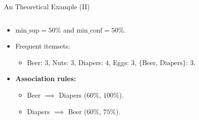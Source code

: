 \begin{frame}{An Theoretical Example (II)}
\begin{columns}
\begin{column}{0.5\textwidth}
\begin{itemize}
\begin{itemize}
					      \item $\text{min\_sup} = 50\%$ and $\text{min\_conf} =
						            50\%$.
					      \item Frequent itemsets:
					            \begin{itemize}
						            \item Beer: $3$, Nuts: $3$, Diapers: $4$, Eggs: $3$,
						                  $\{\text{Beer, Diapers}\}$: $3$.
					            \end{itemize}
					      \item \textbf{Association rules:}
					            \begin{itemize}
						            \item Beer $\implies$ Diapers ($60\%$, $100\%$).
						            \item Diapers $\implies$ Beer ($60\%$, $75\%$).
					            \end{itemize}
				      \end{itemize}
			\end{itemize}
		\end{column}
	\end{columns}
\end{frame}

